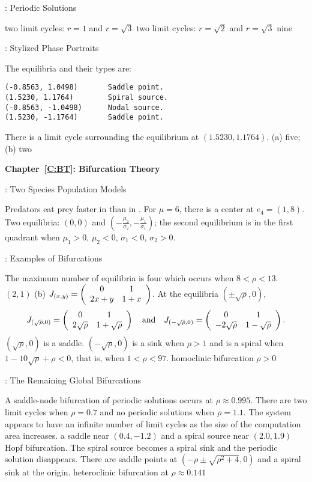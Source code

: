 : Periodic Solutions

\ans two limit cycles: $r = 1$ and $r =\sqrt{3}$
\ans two limit cycles: $r = \sqrt{2}$ and $r = \sqrt{3}$
 \ans nine 


: Stylized Phase Portraits

The equilibria and their types are:
\begin{verbatim}
(-0.8563, 1.0498)       Saddle point.
(1.5230, 1.1764)        Spiral source.
(-0.8563, -1.0498)      Nodal source.
(1.5230, -1.1764)       Saddle point.
\end{verbatim}
There is a limit cycle surrounding the equilibrium at
$(1.5230, 1.1764)$.
\ans (a) five; (b) two   



\vspace{0.08in}

{\bf Chapter~\ref{C:BT}: Bifurcation Theory}

: Two Species Population Models

\ans Predators eat prey faster in  than in .
\ans For $\mu = 6$, there is a center at $e_4 = (1,8)$.
Two equilibria:  $(0,0)$ and $(-\frac{\mu_2}{\sigma_2},
-\frac{\mu_1}{\sigma_1})$;  the second equilibrium is in the first
quadrant when $\mu_1 > 0$, $\mu_2 < 0$, $\sigma_1 < 0$, $\sigma_2 > 0$.  


: Examples of Bifurcations

 \ans The maximum number of equilibria is four which occurs 
when $8 < \rho < 13$. 
 \ans $(2,1)$
 (b)  $J_{(x,y)} = \left(\begin{array}{cc} 0 & 1\\ 2x+y &1+x\end{array}\right)$.
At the equilibria $(\pm\sqrt{\rho},0)$, 
\[
J_{(\sqrt{\rho},0)}= \left(\begin{array}{cc} 0 & 1\\ 2\sqrt{\rho} &1+\sqrt{\rho}\end{array}\right) \quad\mbox{and}\quad
J_{(-\sqrt{\rho},0)}= \left(\begin{array}{cc} 0 & 1\\ -2\sqrt{\rho} &1-\sqrt{\rho}\end{array}\right).
\]
$(\sqrt{\rho},0)$ is a saddle. $(-\sqrt{\rho},0)$ is a sink when $\rho>1$ 
and  is a spiral when  $1-10\sqrt{\rho}+\rho<0$, that is, when $1<\rho<97$.
 homoclinic bifurcation 
 \ans $\rho > 0$




: The Remaining Global Bifurcations

A saddle-node bifurcation of periodic solutions occurs
at $\rho \approx 0.995$. There are two limit cycles
when $\rho = 0.7$ and no periodic solutions when $\rho = 1.1$.
\ans The system appears to have an infinite number of limit cycles
as the size of the computation area increases.
\ans a saddle near $(0.4,-1.2)$ and a spiral source near $(2.0,1.9)$
 Hopf bifurcation.  The spiral source becomes a spiral 
sink and the periodic solution disappears.
 \ans There are saddle points at
$(-\rho \pm \sqrt{\rho^2 + 4},0)$ and a spiral sink at the origin.
 heteroclinic bifurcation at $\rho \approx 0.141$  

